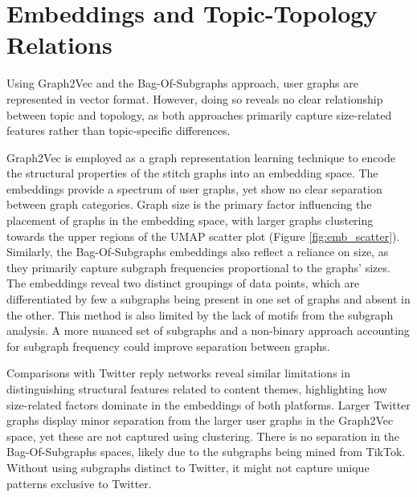 


\section{Embeddings and Topic-Topology Relations}
Using Graph2Vec and the Bag-Of-Subgraphs approach, user graphs are represented in vector format. However, doing so reveals no clear relationship between topic and topology, as both approaches primarily capture size-related features rather than topic-specific differences. 

Graph2Vec is employed as a graph representation learning technique to encode the structural properties of the stitch graphs into an embedding space. The embeddings provide a spectrum of user graphs, yet show no clear separation between graph categories. Graph size is the primary factor influencing the placement of graphs in the embedding space, with larger graphs clustering towards the upper regions of the UMAP scatter plot (Figure \ref{fig:emb_scatter}). Similarly, the Bag-Of-Subgraphs embeddings also reflect a reliance on size, as they primarily capture subgraph frequencies proportional to the graphs' sizes. The embeddings reveal two distinct groupings of data points, which are differentiated by few a subgraphs being present in one set of graphs and absent in the other. This method is also limited by the lack of motifs from the subgraph analysis. A more nuanced set of subgraphs and a non-binary approach accounting for subgraph frequency could improve separation between graphs.  

Comparisons with Twitter reply networks reveal similar limitations in distinguishing structural features related to content themes, highlighting how size-related factors dominate in the embeddings of both platforms. Larger Twitter graphs display minor separation from the larger user graphs in the Graph2Vec space, yet these are not captured using clustering. There is no separation in the Bag-Of-Subgraphs spaces, likely due to the subgraphs being mined from TikTok. Without using subgraphs distinct to Twitter, it might not capture unique patterns exclusive to Twitter. 

